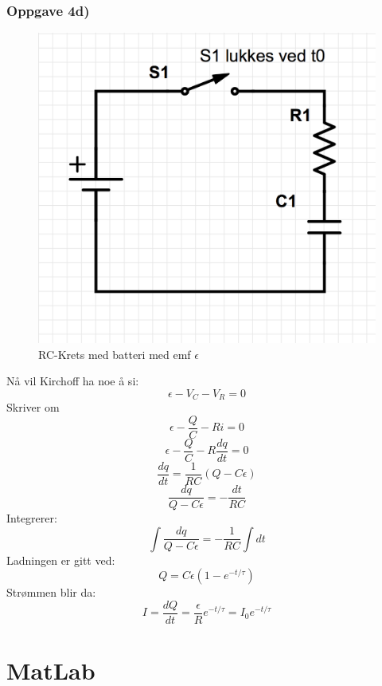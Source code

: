 \documentclass[12pt,a4paper,final,leqno]{report}
\begin{document}
\subsection*{Oppgave 4d)}
\begin{figure}[H]
\caption{RC-Krets med batteri med emf $\epsilon$}
\centering
\includegraphics[width=\textwidth]{krets.jpg}
\end{figure}

Nå vil Kirchoff ha noe å si:
$$
\epsilon - V_C-V_R=0
$$
Skriver om 
$$\epsilon - \frac{Q}{C} -Ri=0
$$
$$
\epsilon- \frac{Q}{C}- R \frac{dq}{dt}=0
$$
$$
\frac{dq}{dt}=\frac{1}{RC}(Q-C\epsilon)
$$
$$
\frac{dq}{Q-C\epsilon }=-\frac{dt}{RC}
$$
Integrerer:
$$
\int \frac{dq}{Q-C\epsilon }=-\frac{1}{RC}\int dt
$$
Ladningen er gitt ved:
$$
Q=C\epsilon (1-e^{-t/\tau})
$$
Strømmen blir da:
$$
I=\frac{dQ}{dt}=\frac{\epsilon}{R} e^{-t/\tau}=I_0e^{-t/\tau}
$$
\chapter*{MatLab}
\end{document}
